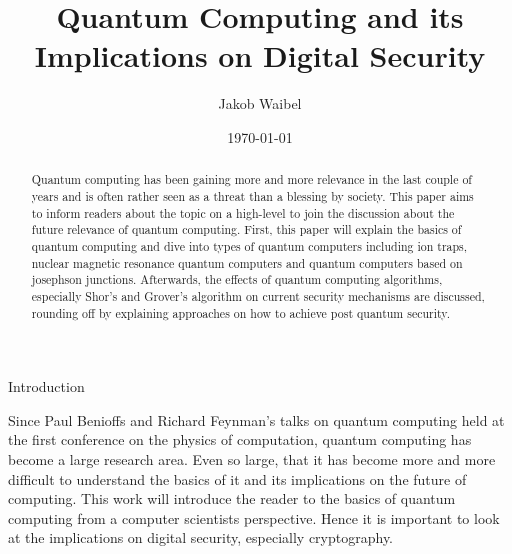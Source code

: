 \documentclass[aps,preprintnumbers,twocolumn]{revtex4}
\begin{document}
\title{Quantum Computing and its Implications on Digital Security}
\author{Jakob Waibel}


\date{\today}

\begin{abstract}
Quantum computing has been gaining more and more relevance in the last couple of years and is often rather seen as a threat than a blessing by society. This paper aims to inform readers about the topic on a high-level to join the discussion about the future relevance of quantum computing. First, this paper will explain the basics of quantum computing and dive into types of quantum computers including ion traps, nuclear magnetic resonance quantum computers and quantum computers based on josephson junctions. Afterwards, the effects of quantum computing algorithms, especially Shor's and Grover's algorithm on current security mechanisms are discussed, rounding off by explaining approaches on how to achieve post quantum security.
\end{abstract}

\maketitle

\begin{section}{Introduction}
    
Since Paul Benioffs and Richard Feynman's talks on quantum computing held at the first conference on the physics of computation, 
quantum computing has become a large research area. 
Even so large, that it has become more and more difficult to understand the basics of it and its implications on the future of computing. 
This work will introduce the reader to the basics of quantum computing from a computer scientists perspective. 
Hence it is important to look at the implications on digital security, especially cryptography.

\end{section}
\end{document}
